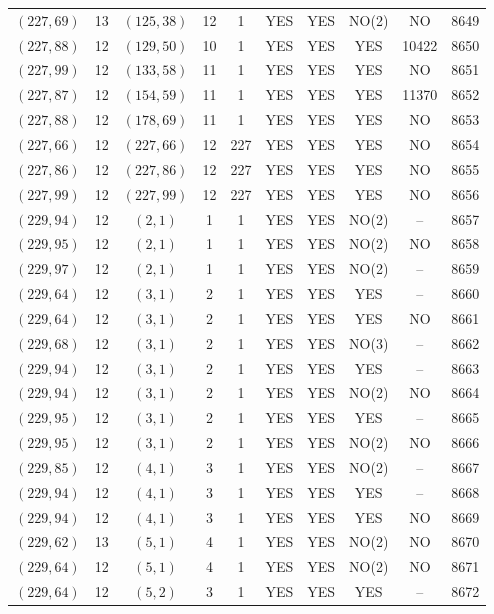 \begin{longtable}{|c|c|c|c|c|c|c|c|c|c|}
$(227, 69)$ & 13 & $(125, 38)$ & 12 & 1 & YES & YES & NO(2) & NO & 8649\\
$(227, 88)$ & 12 & $(129, 50)$ & 10 & 1 & YES & YES & YES & 10422 & 8650\\
$(227, 99)$ & 12 & $(133, 58)$ & 11 & 1 & YES & YES & YES & NO & 8651\\
$(227, 87)$ & 12 & $(154, 59)$ & 11 & 1 & YES & YES & YES & 11370 & 8652\\
$(227, 88)$ & 12 & $(178, 69)$ & 11 & 1 & YES & YES & YES & NO & 8653\\
$(227, 66)$ & 12 & $(227, 66)$ & 12 & 227 & YES & YES & YES & NO & 8654\\
$(227, 86)$ & 12 & $(227, 86)$ & 12 & 227 & YES & YES & YES & NO & 8655\\
$(227, 99)$ & 12 & $(227, 99)$ & 12 & 227 & YES & YES & YES & NO & 8656\\
$(229, 94)$ & 12 & $(2, 1)$ & 1 & 1 & YES & YES & NO(2) & -- & 8657\\
$(229, 95)$ & 12 & $(2, 1)$ & 1 & 1 & YES & YES & NO(2) & NO & 8658\\
$(229, 97)$ & 12 & $(2, 1)$ & 1 & 1 & YES & YES & NO(2) & -- & 8659\\
$(229, 64)$ & 12 & $(3, 1)$ & 2 & 1 & YES & YES & YES & -- & 8660\\
$(229, 64)$ & 12 & $(3, 1)$ & 2 & 1 & YES & YES & YES & NO & 8661\\
$(229, 68)$ & 12 & $(3, 1)$ & 2 & 1 & YES & YES & NO(3) & -- & 8662\\
$(229, 94)$ & 12 & $(3, 1)$ & 2 & 1 & YES & YES & YES & -- & 8663\\
$(229, 94)$ & 12 & $(3, 1)$ & 2 & 1 & YES & YES & NO(2) & NO & 8664\\
$(229, 95)$ & 12 & $(3, 1)$ & 2 & 1 & YES & YES & YES & -- & 8665\\
$(229, 95)$ & 12 & $(3, 1)$ & 2 & 1 & YES & YES & NO(2) & NO & 8666\\
$(229, 85)$ & 12 & $(4, 1)$ & 3 & 1 & YES & YES & NO(2) & -- & 8667\\
$(229, 94)$ & 12 & $(4, 1)$ & 3 & 1 & YES & YES & YES & -- & 8668\\
$(229, 94)$ & 12 & $(4, 1)$ & 3 & 1 & YES & YES & YES & NO & 8669\\
$(229, 62)$ & 13 & $(5, 1)$ & 4 & 1 & YES & YES & NO(2) & NO & 8670\\
$(229, 64)$ & 12 & $(5, 1)$ & 4 & 1 & YES & YES & NO(2) & NO & 8671\\
$(229, 64)$ & 12 & $(5, 2)$ & 3 & 1 & YES & YES & YES & -- & 8672\\

\end{longtable}
